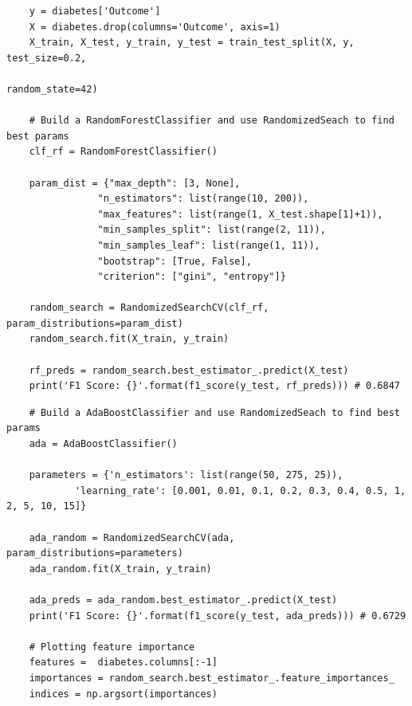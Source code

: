 \documentclass[11pt, a4paper]{article}
\begin{document}
\begin{spacing}{1.1}
\begin{lstlisting}
	y = diabetes['Outcome']
	X = diabetes.drop(columns='Outcome', axis=1)
	X_train, X_test, y_train, y_test = train_test_split(X, y, test_size=0.2, 
	                                                    random_state=42)
	
	# Build a RandomForestClassifier and use RandomizedSeach to find best params
	clf_rf = RandomForestClassifier()
	
	param_dist = {"max_depth": [3, None],
				"n_estimators": list(range(10, 200)),
				"max_features": list(range(1, X_test.shape[1]+1)),
				"min_samples_split": list(range(2, 11)),
				"min_samples_leaf": list(range(1, 11)),
				"bootstrap": [True, False],
				"criterion": ["gini", "entropy"]}
	
	random_search = RandomizedSearchCV(clf_rf, param_distributions=param_dist)
	random_search.fit(X_train, y_train)
	
	rf_preds = random_search.best_estimator_.predict(X_test)
	print('F1 Score: {}'.format(f1_score(y_test, rf_preds))) # 0.6847 \end{lstlisting} \newpage

	\begin{lstlisting}
	# Build a AdaBoostClassifier and use RandomizedSeach to find best params
	ada = AdaBoostClassifier()
	
	parameters = {'n_estimators': list(range(50, 275, 25)),
			'learning_rate': [0.001, 0.01, 0.1, 0.2, 0.3, 0.4, 0.5, 1, 2, 5, 10, 15]}

	ada_random = RandomizedSearchCV(ada, param_distributions=parameters)
	ada_random.fit(X_train, y_train)

	ada_preds = ada_random.best_estimator_.predict(X_test)
	print('F1 Score: {}'.format(f1_score(y_test, ada_preds))) # 0.6729
	
	# Plotting feature importance
	features =  diabetes.columns[:-1]
	importances = random_search.best_estimator_.feature_importances_
	indices = np.argsort(importances)
	

\end{lstlisting}
\end{spacing}
\end{document}
